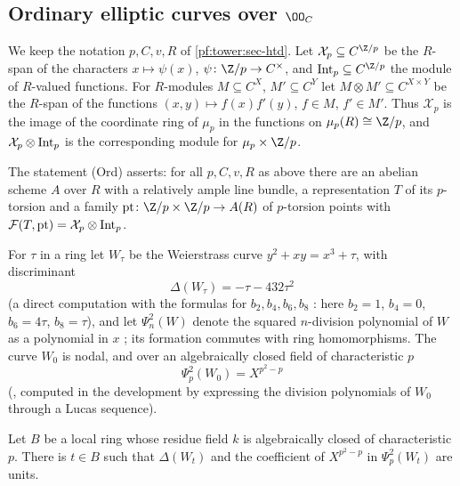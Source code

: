 \subsection{Ordinary elliptic curves over \texorpdfstring{$\OO_C$}{O\_C}}\label{pf:tower:sec-ord}

We keep the notation $p,C,v,R$ of \cref{pf:tower:sec-htd}. Let $\mathcal X_p\subseteq C^{\Z/p}$ be the
$R$-span of the characters $x\mapsto\psi(x)$, $\psi\colon\Z/p\to C^\times$, and $\towerInt_p\subseteq C^{\Z/p}$
the module of $R$-valued functions. For $R$-modules $M\subseteq C^X$, $M'\subseteq C^Y$ let
$M\otimes M'\subseteq C^{X\times Y}$ be the $R$-span of the functions $(x,y)\mapsto f(x)f'(y)$, $f\in M$,
$f'\in M'$. Thus $\mathcal X_p$ is the image of the coordinate ring of $\mu_p$ in the functions on
$\mu_p(R)\cong\Z/p$, and $\mathcal X_p\otimes\mathrm{Int}_p$ is the corresponding module for $\mu_p\times\Z/p$.

\begin{definition}\label{pf:tower:def-ord}
The statement (Ord) asserts: for all $p,C,v,R$ as above there are an abelian scheme $A$ over $R$ with a
relatively ample line bundle, a representation $T$ of its $p$-torsion and a family
$\mathrm{pt}\colon\Z/p\times\Z/p\to A(R)$ of $p$-torsion points with
$\mathcal F(T,\mathrm{pt})=\mathcal X_p\otimes\mathrm{Int}_p$.
\end{definition}

For $\tau$ in a ring let $W_\tau$ be the Weierstrass curve $y^2+xy=x^3+\tau$, with discriminant
\begin{equation}\label{pf:tower:eq-disc}
\Delta(W_\tau)=-\tau-432\tau^2
\end{equation}
(a direct computation with the formulas for $b_2,b_4,b_6,b_8$ \cite[\S III.1]{Silverman2009}: here $b_2=1$, $b_4=0$,
$b_6=4\tau$, $b_8=\tau$), and let $\Psi_n^2(W)$
denote the squared $n$-division polynomial of $W$ as a polynomial in $x$ \cite[Ex.~3.7]{Silverman2009}; its
formation commutes with ring homomorphisms. The curve $W_0$ is nodal, and over an algebraically closed field
of characteristic $p$
\begin{equation}\label{pf:tower:eq-nodal}
\Psi_p^2(W_0)=X^{p^2-p}
\end{equation}
(, computed in the development by expressing
the division polynomials of $W_0$ through a Lucas sequence).

\begin{lemma}\label{pf:tower:ordinary}
Let $B$ be a local ring whose residue field $k$ is algebraically closed of characteristic $p$. There is
$t\in B$ such that $\Delta(W_t)$ and the coefficient of $X^{p^2-p}$ in $\Psi_p^2(W_t)$ are units.
\end{lemma}

